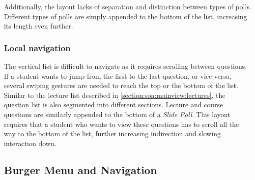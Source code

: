 Additionally, the layout lacks of separation and distinction between types of polls.
Different types of polls are simply appended to the bottom of the list, increasing its length even further.
\todogrf
\subsubsection{Local navigation}

The vertical list is difficult to navigate as it requires scrolling between questions. If a student wants to jump from the first to the last question,  or vice versa, several swiping gestures are needed to reach the top or the bottom of the list.
Similar to the lecture list described in \ref{section:soa:mainview:lectures}, the question list is also segmented into different sections. Lecture and course questions are similarly appended to the bottom of a \emph{Slide Poll}. This layout requires that a student who wants to view these questions has to scroll all the way to the bottom of the list, further increasing indirection and slowing interaction down.



\subsection{Burger Menu and Navigation}
\label{section:con:problems:navigation}

